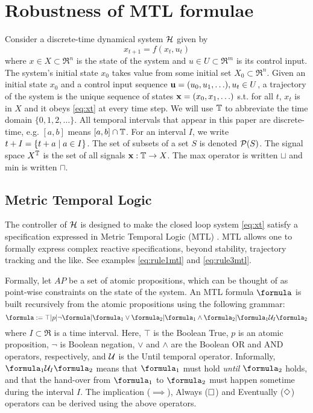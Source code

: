 \section{Robustness of MTL formulae}
\label{sec:robust semantics}

Consider a discrete-time dynamical system $\mathcal{H}$ given by 
\begin{equation}
\label{eq:xt}
x_{t+1} = f(x_t,u_t)
\end{equation}
where $x \in X \subset \Re^n$ is the state of the system and $u \in U \subset \Re^m$ is its control input.
The system's initial state $x_0$ takes value from some initial set $X_0 \subset \Re^n$.
Given an initial state $x_0$ and a control input sequence $\mathbf{u} = (u_0,u_1,\ldots), u_t \in U$, a trajectory of the system is the unique sequence of states $\mathbf{x} = (x_0,x_1,\ldots)$ s.t. for all $t$, $x_t$ is in $X$ and it obeys \eqref{eq:xt} at every time step.
We will use $\mathbb{T}$ to abbreviate the time domain $\{0,1,2,\ldots\}$.
All temporal intervals that appear in this paper are discrete-time, e.g. $[a,b]$ means $[a,b] \cap \mathbb{T}$. 
For an interval $I$, we write $t+I = \{t+a \;|\; a \in I\}$.
The set of subsets of a set $S$ is denoted $\mathcal{P}(S)$.
The signal space $X^{\mathbb{T}}$ is the set of all signals $\mathbf{x}: \mathbb{T} \rightarrow X$.
The max operator is written $\sqcup$ and min is written $\sqcap$.

\subsection{Metric Temporal Logic}
\label{sec:mtl}
The controller of $\mathcal{H}$ is designed to make the closed loop system \eqref{eq:xt} satisfy a specification expressed in Metric Temporal Logic (MTL) \cite{Koymans90}.
MTL allows one to formally express complex reactive specifications, beyond stability, trajectory tracking and the like.
See examples \eqref{eq:rule1mtl} and \eqref{eq:rule3mtl}.

Formally, let $AP$ be a set of atomic propositions, which can be thought of as point-wise constraints on the state of the system.
An MTL formula $\formula$ is built recursively from the atomic propositions using the following grammar:
\[\formula \defeq \top|p|\neg \formula | \formula_1 \lor \formula_2 | \formula_1 \land \formula_2 | \formula_1 \until_I \formula_2\]
where $I \subset \Re$ is a time interval.
Here, $\top$ is the Boolean True, $p$ is an atomic proposition, $\neg$ is Boolean negation, $\lor$ and $\land$ are the Boolean OR and AND operators, respectively, and $\mathcal{U}$ is the Until temporal operator.
Informally, $\formula_1 \until_I \formula_2$ means that $\formula_1$ must hold \textit{until} $\formula_2$ holds, and that the hand-over from $\formula_1$  to $\formula_2$ must happen sometime during the interval $I$.
The implication ($\implies$), Always ($\square$) and Eventually ($\Diamond$) operators can be derived using the above operators.

